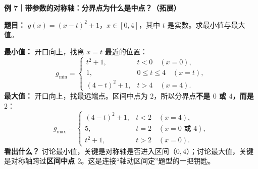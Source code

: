 \clearpage
\begin{examplebox}
\textbf{\textcolor{CExample}{例 7｜带参数的对称轴：分界点为什么是中点？（拓展）}}



\textbf{题目：} $g(x)=(x-t)^2+1$，$x\in[0,4]$，其中 $t$ 是实数。求最小值与最大值。

\textbf{最小值：} 开口向上，找离 $x=t$ 最近的位置：
\[
 g_{\min}=\begin{cases}
 t^2+1,&t<0\quad(x=0),\\
 1,&0\le t\le4\quad(x=t),\\
 (4-t)^2+1,&t>4\quad(x=4).
 \end{cases}
\]
\textbf{最大值：} 开口向上，找最远端点。区间中点为 $2$，所以分界点\textbf{不是 $0$ 或 $4$，而是 $2$}：
\[
 g_{\max}=\begin{cases}
 (4-t)^2+1,&t<2\quad(x=4),\\
 5,&t=2\quad(x=0\text{ 或 }4),\\
 t^2+1,&t>2\quad(x=0).
 \end{cases}
\]
\textbf{看出什么？} 讨论最小值，关键是对称轴是否进入区间（$0,4$）；讨论最大值，关键是对称轴跨过\textbf{区间中点 $2$}。这是连接“轴动区间定”题型的一把钥匙。
\end{examplebox}
